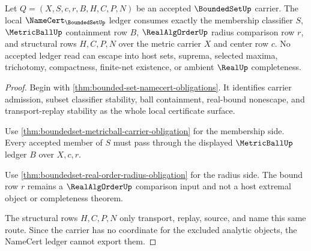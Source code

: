 \begin{theorem}
\label{thm:boundedset-namecert-ledger-nonescape}
Let $Q=(X,S,c,r,B,H,C,P,N)$ be an accepted $\BoundedSetUp$ carrier. The local $\NameCert_{\BoundedSetUp}$ ledger consumes exactly the membership classifier $S$, $\MetricBallUp$ containment row $B$, $\RealAlgOrderUp$ radius comparison row $r$, and structural rows $H,C,P,N$ over the metric carrier $X$ and center row $c$. No accepted ledger read can escape into host sets, suprema, selected maxima, trichotomy, compactness, finite-net existence, or ambient $\RealUp$ completeness.
\end{theorem}
\begin{proof}
Begin with \autoref{thm:bounded-set-namecert-obligations}. It identifies carrier admission, subset classifier stability, ball containment, real-bound nonescape, and transport-replay stability as the whole local certificate surface.

Use \autoref{thm:boundedset-metricball-carrier-obligation} for the membership side. Every accepted member of $S$ must pass through the displayed $\MetricBallUp$ ledger $B$ over $X,c,r$.

Use \autoref{thm:boundedset-real-order-radius-obligation} for the radius side. The bound row $r$ remains a $\RealAlgOrderUp$ comparison input and not a host extremal object or completeness theorem.

The structural rows $H,C,P,N$ only transport, replay, source, and name this same route. Since the carrier has no coordinate for the excluded analytic objects, the NameCert ledger cannot export them.
\end{proof}

